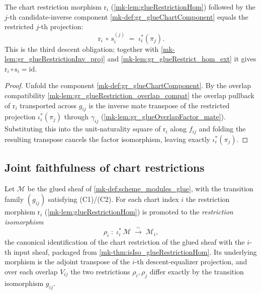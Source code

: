 \begin{lemma}\label{mk-lem:gr_glueRestrictionHom_glueChartComponent}
  \leanok

  The chart restriction morphism \(\mathrm{r}_i\) (\ref{mk-lem:glueRestrictionHom})
  followed by the \(j\)-th candidate-inverse component \ref{mk-def:gr_glueChartComponent}
  equals the restricted \(j\)-th projection:
  \[
    \mathrm{r}_i\ \circ\ \mathrm{s}_i^{(j)}
      \;=\; \iota_i^{*}(\pi_j).
  \]
  This is the third descent obligation; together with
  \ref{mk-lem:gr_glueRestrictionInv_proj} and \ref{mk-lem:gr_glueRestrict_hom_ext} it gives
  \(\mathrm{r}_i \circ \mathrm{s}_i = \mathrm{id}\).
\end{lemma}
\begin{proof}
  \leanok
    Unfold the component \ref{mk-def:gr_glueChartComponent}. By the overlap compatibility
  \ref{mk-lem:gr_glueRestriction_overlap_compat} the overlap pullback of \(\mathrm{r}_i\)
  transported across \(g_{ij}\) is the inverse mate transpose of the restricted
  projection \(\iota_i^{*}(\pi_j)\) through \(\gamma_{ij}\)
  (\ref{mk-lem:gr_glueOverlapFactor_mate}). Substituting this into the unit-naturality
  square of \(\mathrm{r}_i\) along \(f_{ij}\) and folding the resulting transpose
  cancels the factor isomorphism, leaving exactly \(\iota_i^{*}(\pi_j)\).
\end{proof}

\subsection{Joint faithfulness of chart restrictions}


\begin{definition}\label{mk-def:glueRestrictionIso}
  \lean{}
  \leanok

  Let \(\mathcal{M}\) be the glued sheaf of \ref{mk-def:scheme_modules_glue}, with the
  transition family \((g_{ij})\) satisfying (C1)/(C2). For each chart index \(i\) the
  restriction morphism \(\mathrm{r}_i\) (\ref{mk-lem:glueRestrictionHom}) is promoted to
  the \emph{restriction isomorphism}
  \[
    \rho_i \;:\; \iota_i^{*}\,\mathcal{M} \;\xrightarrow{\ \sim\ }\; \mathcal{M}_i,
  \]
  the canonical identification of the chart restriction of the glued sheaf with the
  \(i\)-th input sheaf, packaged from \ref{mk-thm:isIso_glueRestrictionHom}. Its
  underlying morphism is the adjoint transpose of the \(i\)-th descent-equalizer
  projection, and over each overlap \(V_{ij}\) the two restrictions \(\rho_i, \rho_j\)
  differ exactly by the transition isomorphism \(g_{ij}\).
\end{definition}
